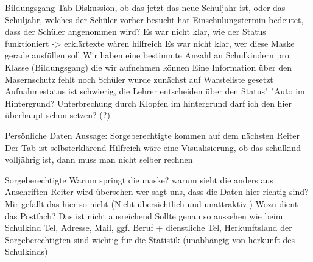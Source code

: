 Bildungsgang-Tab		
Diskussion, ob das jetzt das neue Schuljahr ist, oder das Schuljahr, welches der Schüler vorher besucht hat
Einschulungstermin bedeutet, dass der Schüler angenommen wird?
Es war nicht klar, wie der Status funktioniert -> erklärtexte wären hilfreich
Es war nicht klar, wer diese Maske gerade ausfüllen soll
Wir haben eine bestimmte Anzahl an Schulkindern pro Klasse (Bildungsgang) die wir aufnehmen können
Eine Information über den Masernschutz fehlt noch
Schüler wurde zunächst auf Warsteliste gesetzt
Aufnahmestatus ist schwierig, die Lehrer entscheiden über den Status"	"Auto im Hintergrund?
Unterbrechung durch Klopfen im hintergrund
darf ich den hier überhaupt schon setzen? (?)













































Persönliche Daten
Aussage: Sorgeberechtigte kommen auf dem nächsten Reiter
Der Tab ist selbsterklärend 
Hilfreich wäre eine Visualisierung, ob das schulkind volljährig ist, dann muss man nicht selber rechnen


















Sorgeberechtigte
Warum springt die maske?
warum sieht die anders aus
Anschriften-Reiter wird übersehen
wer sagt uns, dass die Daten hier richtig sind?
Mir gefällt das hier so nicht (Nicht übersichtlich und unattraktiv.)
Wozu dient das Postfach?
Das ist nicht ausreichend
Sollte genau so aussehen wie beim Schulkind
Tel, Adresse, Mail, ggf. Beruf + dienstliche Tel, Herkunftsland der Sorgeberechtigten sind wichtig für die Statistik (unabhängig von herkunft des Schulkinds)



























